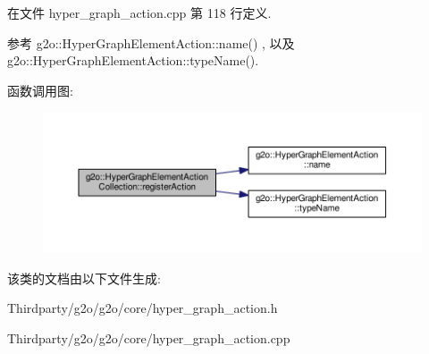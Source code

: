 在文件 hyper\-\_\-graph\-\_\-action.\-cpp 第 118 行定义.



参考 g2o\-::\-Hyper\-Graph\-Element\-Action\-::name() , 以及 g2o\-::\-Hyper\-Graph\-Element\-Action\-::type\-Name().



函数调用图\-:
\nopagebreak
\begin{figure}[H]
\begin{center}
\leavevmode
\includegraphics[width=350pt]{classg2o_1_1HyperGraphElementActionCollection_a9eb641e9c9bb22f3540dc98c2c750ea9_cgraph}
\end{center}
\end{figure}




该类的文档由以下文件生成\-:\begin{DoxyCompactItemize}
\item 
Thirdparty/g2o/g2o/core/hyper\-\_\-graph\-\_\-action.\-h\item 
Thirdparty/g2o/g2o/core/hyper\-\_\-graph\-\_\-action.\-cpp\end{DoxyCompactItemize}
